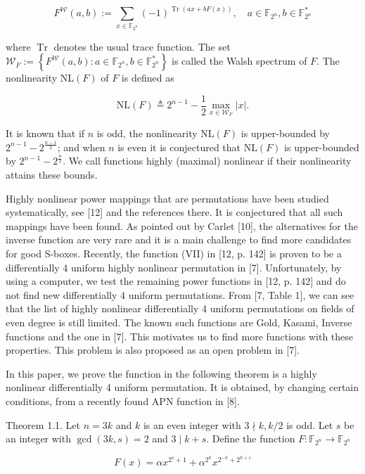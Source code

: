 \documentclass[10pt]{article}
\begin{document}
$$
F^{\mathcal{W}}(a, b):=\sum_{x \in \mathbb{F}_{2^{n}}}(-1)^{\operatorname{Tr}(a x+b F(x))}, \quad a \in \mathbb{F}_{2^{n}}, b \in \mathbb{F}_{2^{n}}^{*}
$$

where $\operatorname{Tr}$ denotes the usual trace function. The set $\mathcal{W}_{F}:=\left\{F^{\mathcal{W}}(a, b): a \in \mathbb{F}_{2^{n}}, b \in \mathbb{F}_{2^{n}}^{*}\right\}$ is called the Walsh spectrum of $F$. The nonlinearity $\mathrm{NL}(F)$ of $F$ is defined as

$$
\mathrm{NL}(F) \triangleq 2^{n-1}-\frac{1}{2} \max _{x \in \mathcal{W}_{F}}|x| .
$$

It is known that if $n$ is odd, the nonlinearity $\mathrm{NL}(F)$ is upper-bounded by $2^{n-1}-2^{\frac{n-1}{2}}$; and when $n$ is even it is conjectured that $\mathrm{NL}(F)$ is upper-bounded by $2^{n-1}-2^{\frac{n}{2}}$. We call functions highly (maximal) nonlinear if their nonlinearity attains these bounds.

Highly nonlinear power mappings that are permutations have been studied systematically, see [12] and the references there. It is conjectured that all such mappings have been found. As pointed out by Carlet [10], the alternatives for the inverse function are very rare and it is a main challenge to find more candidates for good S-boxes. Recently, the function (VII) in [12, p. 142] is proven to be a differentially 4 uniform highly nonlinear permutation in [7]. Unfortunately, by using a computer, we test the remaining power functions in [12, p. 142] and do not find new differentially 4 uniform permutations. From [7, Table 1], we can see that the list of highly nonlinear differentially 4 uniform permutations on fields of even degree is still limited. The known such functions are Gold, Kasami, Inverse functions and the one in [7]. This motivates us to find more functions with these properties. This problem is also proposed as an open problem in [7].

In this paper, we prove the function in the following theorem is a highly nonlinear differentially 4 uniform permutation. It is obtained, by changing certain conditions, from a recently found APN function in [8].

Theorem 1.1. Let $n=3 k$ and $k$ is an even integer with $3 \nmid k, k / 2$ is odd. Let $s$ be an integer with $\operatorname{gcd}(3 k, s)=2$ and $3 \mid k+s$. Define the function $F: \mathbb{F}_{2^{n}} \rightarrow \mathbb{F}_{2^{n}}$


\begin{equation*}
F(x)=\alpha x^{2^{s}+1}+\alpha^{2^{k}} x^{2^{-k}+2^{k+s}} \tag{1}
\end{equation*}
\end{document}
